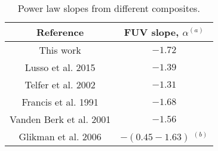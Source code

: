 \begin{table}
\centering
\begin{center}
\caption{Power law slopes from different composites.}
\begin{tabular}{cc}
\hline
\noalign{\smallskip}
Reference &  FUV slope, $\alpha$$^{(a)}$ \\  
\hline


This work  & $-1.72$   \\
Lusso et al. 2015  & $-1.39$   \\
Telfer et al. 2002  & $-1.31$   \\
Francis et al. 1991  & $-1.68 $   \\

Vanden Berk et al. 2001  & $-1.56$   \\
Glikman et al. 2006 & $-(0.45 - 1.63)$ $^{(b)}$  \\

\hline
\hline
\end{tabular}
\end{center}


\end{table}



